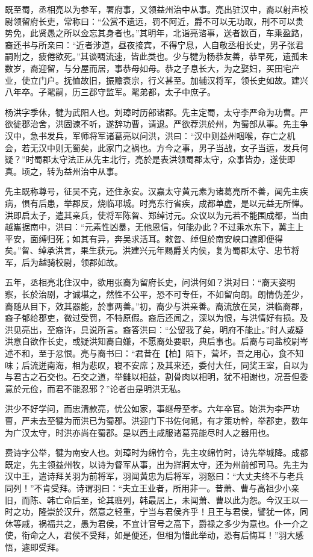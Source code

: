 \documentclass[12pt,UTF8]{ctexbook}
\begin{document}
既至蜀，丞相亮以为参军，署府事，又领益州治中从事。亮出驻汉中，裔以射声校尉领留府长吏，常称曰：“公赏不遗远，罚不阿近，爵不可以无功取，刑不可以贵势免，此贤愚之所以佥忘其身者也。”其明年，北诣亮谘事，送者数百，车乘盈路，裔还书与所亲曰：“近者涉道，昼夜接宾，不得宁息，人自敬丞相长史，男子张君嗣附之，疲倦欲死。”其谈啁流速，皆此类也。少与犍为杨恭友善，恭早死，遗孤未数岁，裔迎留，与分屋而居，事恭母如母。恭之子息长大，为之娶妇，买田宅产业，使立门户。抚恤故旧，振赡衰宗，行义甚至。加辅汉将军，领长史如故。建兴八年卒。子毣嗣，历三郡守监军。毣弟都，太子中庶子。

杨洪字季休，犍为武阳人也。刘璋时历部诸郡。先主定蜀，太守李严命为功曹。严欲徙郡治舍，洪固谏不听，遂辞功曹，请退。严欲荐洪於州，为蜀部从事。先主争汉中，急书发兵，军师将军诸葛亮以问洪，洪曰：“汉中则益州咽喉，存亡之机会，若无汉中则无蜀矣，此家门之祸也。方今之事，男子当战，女子当运，发兵何疑？”时蜀郡太守法正从先主北行，亮於是表洪领蜀郡太守，众事皆办，遂使即真。顷之，转为益州治中从事。

先主既称尊号，征吴不克，还住永安。汉嘉太守黄元素为诸葛亮所不善，闻先主疾病，惧有后患，举郡反，烧临邛城。时亮东行省疾，成都单虚，是以元益无所惮。洪即启太子，遣其亲兵，使将军陈曶、郑绰讨元。众议以为元若不能围成都，当由越巂据南中，洪曰：“元素性凶暴，无他恩信，何能办此？不过乘水东下，冀主上平安，面缚归死；如其有异，奔吴求活耳。敕曶、绰但於南安峡口遮即便得矣。”曶、绰承洪言，果生获元。洪建兴元年赐爵关内侯，复为蜀郡太守、忠节将军，后为越骑校尉，领郡如故。

五年，丞相亮北住汉中，欲用张裔为留府长史，问洪何如？洪对曰：“裔天姿明察，长於治剧，才诚堪之，然性不公平，恐不可专任，不如留向朗。朗情伪差少，裔随从目下，效其器能，於事两善。”初，裔少与洪亲善。裔流放在吴，洪临裔郡，裔子郁给郡吏，微过受罚，不特原假。裔后还闻之，深以为恨，与洪情好有损。及洪见亮出，至裔许，具说所言。裔答洪曰：“公留我了矣，明府不能止。”时人或疑洪意自欲作长史，或疑洪知裔自嫌，不愿裔处要职，典后事也。后裔与司盐校尉岑述不和，至于忿恨。亮与裔书曰：“君昔在【柏】陌下，营坏，吾之用心，食不知味；后流迸南海，相为悲叹，寝不安席；及其来还，委付大任，同奖王室，自以为与君古之石交也。石交之道，举雠以相益，割骨肉以相明，犹不相谢也，况吾但委意於元俭，而君不能忍邪？”论者由是明洪无私。

洪少不好学问，而忠清款亮，忧公如家，事继母至孝。六年卒官。始洪为李严功曹，严未去至犍为而洪已为蜀郡。洪迎门下书佐何祗，有才策功幹，举郡吏，数年为广汉太守，时洪亦尚在蜀郡。是以西土咸服诸葛亮能尽时人之器用也。

费诗字公举，犍为南安人也。刘璋时为绵竹令，先主攻绵竹时，诗先举城降。成都既定，先主领益州牧，以诗为督军从事，出为牂牁太守，还为州前部司马。先主为汉中王，遣诗拜关羽为前将军，羽闻黄忠为后将军，羽怒曰：“大丈夫终不与老兵同列！”不肯受拜。诗谓羽曰：“夫立王业者，所用非一。昔萧、曹与高祖少小亲旧，而陈、韩亡命后至，论其班列，韩最居上，未闻萧、曹以此为怨。今汉王以一时之功，隆崇於汉升，然意之轻重，宁当与君侯齐乎！且王与君侯，譬犹一体，同休等戚，祸福共之，愚为君侯，不宜计官号之高下，爵禄之多少为意也。仆一介之使，衔命之人，君侯不受拜，如是便还，但相为惜此举动，恐有后悔耳！”羽大感悟，遽即受拜。
\end{document}
